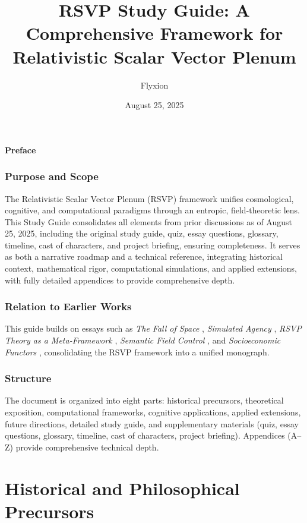 \documentclass[12pt]{report}
\title{RSVP Study Guide: A Comprehensive Framework for Relativistic Scalar Vector Plenum}
\author{Flyxion}
\date{August 25, 2025}
\begin{document}
\maketitle
\tableofcontents

\begin{center}
    \textbf{Preface}
\end{center}

\section*{Purpose and Scope}
The Relativistic Scalar Vector Plenum (RSVP) framework unifies cosmological, cognitive, and computational paradigms through an entropic, field-theoretic lens. This Study Guide consolidates all elements from prior discussions as of August 25, 2025, including the original study guide, quiz, essay questions, glossary, timeline, cast of characters, and project briefing, ensuring completeness. It serves as both a narrative roadmap and a technical reference, integrating historical context, mathematical rigor, computational simulations, and applied extensions, with fully detailed appendices to provide comprehensive depth.

\section*{Relation to Earlier Works}
This guide builds on essays such as \textit{The Fall of Space} \citep{FallOfSpace2025}, \textit{Simulated Agency} \citep{SimulatedAgency2025}, \textit{RSVP Theory as a Meta-Framework} \citep{RSVPMeta2025}, \textit{Semantic Field Control} \citep{SemanticField2025}, and \textit{Socioeconomic Functors} \citep{SocioeconomicFunctors2025}, consolidating the RSVP framework into a unified monograph.

\section*{Structure}
The document is organized into eight parts: historical precursors, theoretical exposition, computational frameworks, cognitive applications, applied extensions, future directions, detailed study guide, and supplementary materials (quiz, essay questions, glossary, timeline, cast of characters, project briefing). Appendices (A--Z) provide comprehensive technical depth.

\part{Historical and Philosophical Precursors}
\end{document}
